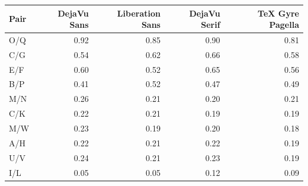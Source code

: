 \begin{tabular}{lrrrr}
\toprule
Pair & DejaVu Sans & Liberation Sans & DejaVu Serif & TeX Gyre Pagella\\
\midrule
O/Q & 0.92 & 0.85 & 0.90 & 0.81\\
C/G & 0.54 & 0.62 & 0.66 & 0.58\\
E/F & 0.60 & 0.52 & 0.65 & 0.56\\
B/P & 0.41 & 0.52 & 0.47 & 0.49\\
M/N & 0.26 & 0.21 & 0.20 & 0.21\\
C/K & 0.22 & 0.21 & 0.19 & 0.19\\
M/W & 0.23 & 0.19 & 0.20 & 0.18\\
A/H & 0.22 & 0.21 & 0.22 & 0.19\\
U/V & 0.24 & 0.21 & 0.23 & 0.19\\
I/L & 0.05 & 0.05 & 0.12 & 0.09\\
\bottomrule
\end{tabular}

